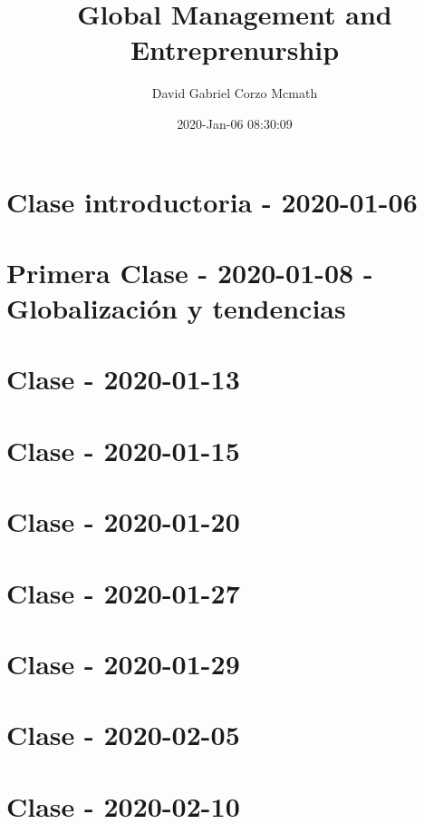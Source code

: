 \documentclass[oneside]{book}
\title{Global Management and Entreprenurship}
\author{David Gabriel Corzo Mcmath}
\date{2020-Jan-06 08:30:09}
\begin{document}
\maketitle
\tableofcontents

\tikzblockdefinitions

\chapter{Clase introductoria - 2020-01-06}


\chapter{Primera Clase - 2020-01-08 - Globalización y tendencias}


\chapter{Clase - 2020-01-13}


\chapter{Clase - 2020-01-15}


\chapter{Clase - 2020-01-20}


\chapter{Clase - 2020-01-27}


\chapter{Clase - 2020-01-29}   


\chapter{Clase - 2020-02-05}


\chapter{Clase - 2020-02-10}

\end{document}
